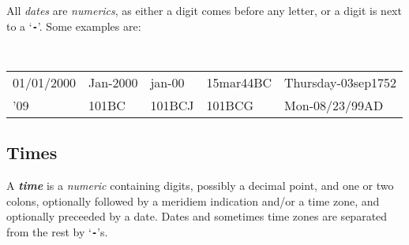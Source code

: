 \documentclass[12pt]{article}
\newcommand{\TT}[1]{{\tt \bfseries #1}}
\newcommand{\key}[1]{{\bf \em #1}\index{#1}}
\newenvironment{indpar}[1][0.3in]%
	{\begin{list}{}%
		     {\setlength{\itemsep}{0in}%
		      \setlength{\topsep}{0in}%
		      \setlength{\parsep}{1ex}%
		      \setlength{\labelwidth}{#1}%
		      \setlength{\leftmargin}{#1}%
		      \addtolength{\leftmargin}{\labelsep}}%
	 \item}%
	{\end{list}}
\begin{document}
All {\em dates} are {\em numerics}, as either a digit comes before
any letter, or a digit is next to a `\TT{-}'.  Some examples are:

\begin{indpar}[0.1in]
\tt
\begin{tabular}{@{}l@{~~}l@{~~}l@{~~}l@{~~}l@{}}
01/01/2000	& Jan-2000	 & jan-00	& 15mar44BC
						& Thursday-03sep1752 \\
'09		& 101BC		 & 101BCJ	& 101BCG
						& Mon-08/23/99AD \\
\end{tabular}
\end{indpar}

\subsection{Times}
\label{TIMES}

A \key{time} is a {\em numeric} containing digits, possibly a decimal
point, and one or two colons, optionally followed by a meridiem indication
and/or a time zone, and optionally preceeded by a date.  Dates and sometimes
time zones are separated from the rest by `\TT{-}'s.
\end{document}
